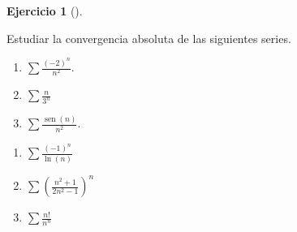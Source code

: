 \documentclass[
  a4paper,
]{scrreport}
\theoremstyle{definition}
\newtheorem{exercise}{Ejercicio}[chapter]
\theoremstyle{remark}
\begin{document}
\begin{exercise}[]\protect\hypertarget{exr-convergencia-absoluta}{}\label{exr-convergencia-absoluta}

Estudiar la convergencia absoluta de las siguientes series.

\begin{enumerate}
\def\labelenumi{\alph{enumi}.}
\item
  \(\sum \frac{(-2)^n}{n^2}\).
\item
  \(\sum \frac{n}{3^n}\)
\item
  \(\sum \frac{\operatorname{sen}(n)}{n^2}\).
\end{enumerate}

\begin{enumerate}
\def\labelenumi{\alph{enumi}.}
\setcounter{enumi}{3}
\item
  \(\sum \frac{(-1)^n}{\ln(n)}\)
\item
  \(\sum \left(\frac{n^2+1}{2n^2-1}\right)^n\)
\item
  \(\sum \frac{n!}{n^n}\)
\end{enumerate}

\end{exercise}
\end{document}
